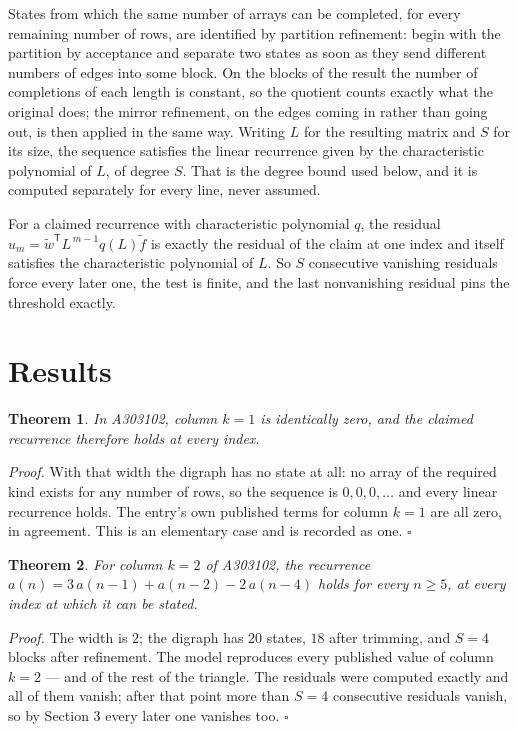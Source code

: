 \documentclass[11pt]{article}
\newtheorem{theorem}{Theorem}
\theoremstyle{definition}
\begin{document}
States from which the same number of arrays can be completed, for every remaining number of rows, are identified by partition refinement: begin with the partition by acceptance and separate two states as soon as they send different numbers of edges into some block. On the blocks of the result the number of completions of each length is constant, so the quotient counts exactly what the original does; the mirror refinement, on the edges coming in rather than going out, is then applied in the same way. Writing $L$ for the resulting matrix and $S$ for its size, the sequence satisfies the linear recurrence given by the characteristic polynomial of $L$, of degree $S$. That is the degree bound used below, and it is computed separately for every line, never assumed.

For a claimed recurrence with characteristic polynomial $q$, the residual $u_m = \tilde w^{\mathsf T}L^{\,m-1}q(L)\tilde f$ is exactly the residual of the claim at one index and itself satisfies the characteristic polynomial of $L$. So $S$ consecutive vanishing residuals force every later one, the test is finite, and the last nonvanishing residual pins the threshold exactly.

\section{Results}

\begin{theorem} In A303102, column $k = 1$ is identically zero, and the claimed recurrence therefore holds at every index.\end{theorem}

{\itshape Proof.} With that width the digraph has no state at all: no array of the required kind exists for any number of rows, so the sequence is $0,0,0,\dots$ and every linear recurrence holds. The entry's own published terms for column $k = 1$ are all zero, in agreement. This is an elementary case and is recorded as one. $\square$

\begin{theorem} For column $k = 2$ of A303102, the recurrence $a(n) = 3\,a(n-1) + a(n-2) - 2\,a(n-4)$ holds for every $n \ge 5$, at every index at which it can be stated.\end{theorem}

{\itshape Proof.} The width is $2$; the digraph has $20$ states, $18$ after trimming, and $S = 4$ blocks after refinement. The model reproduces every published value of column $k = 2$ --- and of the rest of the triangle. The residuals were computed exactly and all of them vanish; after that point more than $S = 4$ consecutive residuals vanish, so by Section 3 every later one vanishes too. $\square$
\end{document}
